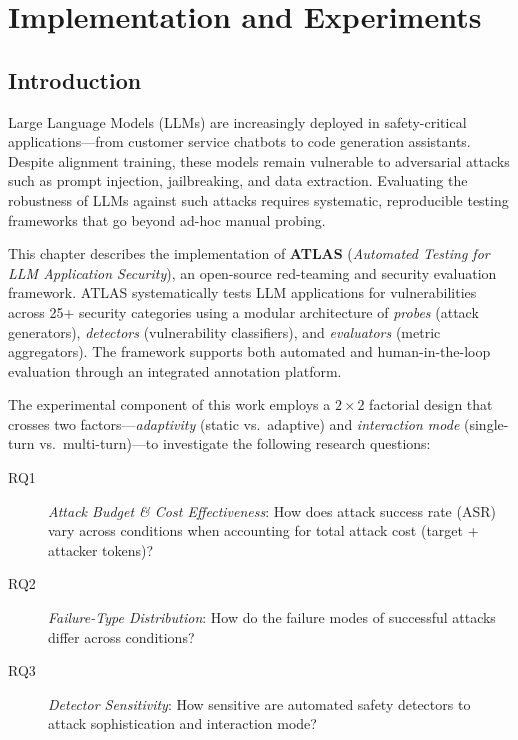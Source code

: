\documentclass[12pt,a4paper]{report}
\begin{document}
\chapter{Implementation and Experiments}
\label{ch:implementation}

\section{Introduction}
\label{sec:impl-intro}

Large Language Models (LLMs) are increasingly deployed in safety-critical applications---from customer service chatbots to code generation assistants. Despite alignment training, these models remain vulnerable to adversarial attacks such as prompt injection, jailbreaking, and data extraction. Evaluating the robustness of LLMs against such attacks requires systematic, reproducible testing frameworks that go beyond ad-hoc manual probing.

This chapter describes the implementation of \textbf{ATLAS} (\textit{Automated Testing for LLM Application Security}), an open-source red-teaming and security evaluation framework. ATLAS systematically tests LLM applications for vulnerabilities across 25+ security categories using a modular architecture of \textit{probes} (attack generators), \textit{detectors} (vulnerability classifiers), and \textit{evaluators} (metric aggregators). The framework supports both automated and human-in-the-loop evaluation through an integrated annotation platform.

The experimental component of this work employs a $2 \times 2$ factorial design that crosses two factors---\textit{adaptivity} (static vs.\ adaptive) and \textit{interaction mode} (single-turn vs.\ multi-turn)---to investigate the following research questions:

\begin{description}
    \item[RQ1] \textit{Attack Budget \& Cost Effectiveness}: How does attack success rate (ASR) vary across conditions when accounting for total attack cost (target + attacker tokens)?
    \item[RQ2] \textit{Failure-Type Distribution}: How do the failure modes of successful attacks differ across conditions?
    \item[RQ3] \textit{Detector Sensitivity}: How sensitive are automated safety detectors to attack sophistication and interaction mode?
\end{description}
\end{document}
